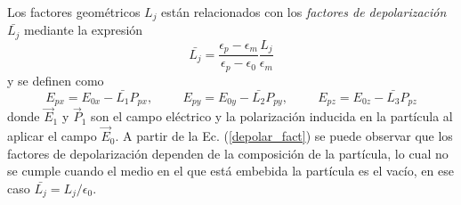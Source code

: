 Los factores geométricos $L_j$ están relacionados con los \textit{factores de depolarización} $\bar{L_j}$ mediante la expresión \cite{Bohren}
\begin{equation}
	\bar{L_j}=\frac{\epsilon_p-\epsilon_m}{\epsilon_p-\epsilon_0}\frac{L_j}{\epsilon_m}
	\label{depolar_fact}
\end{equation}
y se definen como 
\begin{equation*}
    E_{px}=E_{0x}-\bar{L_1}P_{px},\hspace{1cm}    E_{py}=E_{0y}-\bar{L_2}P_{py},\hspace{1cm}    E_{pz}=E_{0z}-\bar{L_3}P_{pz}
\end{equation*}
donde $\Vec{E}_1$ y $\Vec{P}_1$ son el campo eléctrico y la polarización inducida en la partícula al aplicar el campo $\Vec{E}_0$. A partir de la Ec. (\ref{depolar_fact}) se puede observar que los factores de depolarización dependen de la composición de la partícula, lo cual no se cumple cuando el medio en el que está embebida la partícula es el vacío, en ese caso $\bar{L_j}=L_j/\epsilon_0$. 